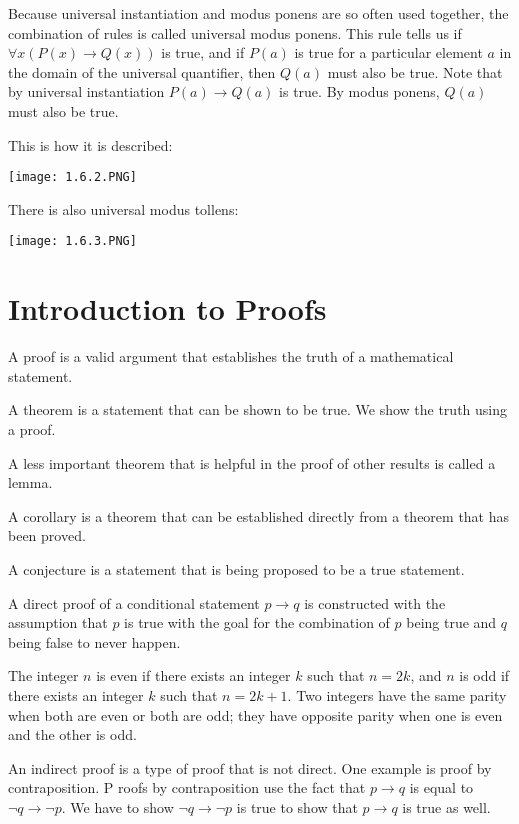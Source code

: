 \documentclass[../discrete.tex]{subfiles}
\begin{document}
Because universal instantiation and modus ponens are so often used together, the combination of rules 
is called universal modus ponens. This rule tells us if $\forall x (P(x)\rightarrow Q(x))$ is true, 
and if $P(a)$ is true for a particular element $a$ in the domain of the universal quantifier, 
then $Q(a)$ must also be true. Note that by universal instantiation $P(a)\rightarrow Q(a)$ is true. 
By modus ponens, $Q(a)$ must also be true. 

This is how it is described:
\begin{center}
    \texttt{[image: 1.6.2.PNG]}
\end{center}

There is also universal modus tollens:
\begin{center}
    \texttt{[image: 1.6.3.PNG]}
\end{center}

\section{Introduction to Proofs}
A proof is a valid argument that establishes the truth of a mathematical statement. 

A theorem is a statement that can be shown to be true. We show the truth using a proof.

A less important theorem that is helpful in the proof of other results is called a lemma. 

A corollary is a theorem that can be established directly from a theorem that has been proved. 

A conjecture is a statement that is being proposed to be a true statement.

A direct proof of a conditional statement $p\rightarrow q$ is constructed with the 
assumption that $p$ is true with the goal for the combination of $p$ being true and $q$ being false to never happen. 
\begin{definition}
    The integer $n$ is even if there exists an integer $k$ such that $n=2k$, and $n$ is odd if there exists an 
    integer $k$ such that $n=2k+1$. Two integers have the same parity when both are even or both are odd; they have 
    opposite parity when one is even and the other is odd.
\end{definition}

An indirect proof is a type of proof that is not direct. One example is proof by contraposition. P
roofs by contraposition use the fact that $p\rightarrow q$ is equal to $\neg q \rightarrow \neg p$. 
We have to show $\neg q \rightarrow \neg p$ is true to show that $p\rightarrow q$ is true as well.
\end{document}
